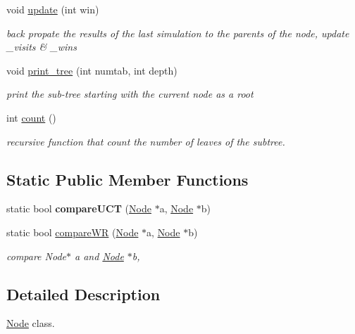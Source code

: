 \begin{DoxyCompactItemize}
void \hyperlink{classmcts_1_1_node_ad15ddfec38ddb675920017670dbd92ee}{update} (int win)
\begin{DoxyCompactList}\small\item\em back propate the results of the last simulation to the parents of the node, update \+\_\+visits \& \+\_\+wins \end{DoxyCompactList}\item 
void \hyperlink{classmcts_1_1_node_a7a4c678e7229510df95df9b85b8bdee7}{print\+\_\+tree} (int numtab, int depth)
\begin{DoxyCompactList}\small\item\em print the sub-\/tree starting with the current node as a root \end{DoxyCompactList}\item 
int \hyperlink{classmcts_1_1_node_a458687d6ff5ef166ceea1d53304f8f94}{count} ()
\begin{DoxyCompactList}\small\item\em recursive function that count the number of leaves of the subtree. \end{DoxyCompactList}\end{DoxyCompactItemize}
\subsection*{Static Public Member Functions}
\begin{DoxyCompactItemize}
\item 
\hypertarget{classmcts_1_1_node_ac02a20d5b1bfe6eae84e70ae21fc61a0}{static bool {\bfseries compare\+U\+C\+T} (\hyperlink{classmcts_1_1_node}{Node} $\ast$a, \hyperlink{classmcts_1_1_node}{Node} $\ast$b)}\label{classmcts_1_1_node_ac02a20d5b1bfe6eae84e70ae21fc61a0}

\item 
static bool \hyperlink{classmcts_1_1_node_a6208d3fe6945797ed60c23c96ad35e97}{compare\+W\+R} (\hyperlink{classmcts_1_1_node}{Node} $\ast$a, \hyperlink{classmcts_1_1_node}{Node} $\ast$b)
\begin{DoxyCompactList}\small\item\em compare Node$\ast$ a and \hyperlink{classmcts_1_1_node}{Node} $\ast$b, \end{DoxyCompactList}\end{DoxyCompactItemize}


\subsection{Detailed Description}
\hyperlink{classmcts_1_1_node}{Node} class. 

